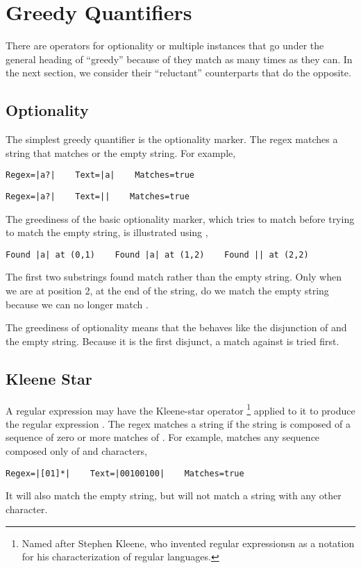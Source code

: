 \section{Greedy Quantifiers}

There are operators for optionality or multiple instances that go
under the general heading of ``greedy'' because of they match as
many times as they can.  In the next section, we consider their
``reluctant'' counterparts that do the opposite.

\subsection{Optionality}

The simplest greedy quantifier is the optionality marker.  The regex
 matches a string that matches  or the
empty string.  For example,
%
\begin{verbatim}
Regex=|a?|    Text=|a|    Matches=true
\end{verbatim}
%
\begin{verbatim}
Regex=|a?|    Text=||    Matches=true
\end{verbatim}

The greediness of the basic optionality marker, which tries to match
before trying to match the empty string, is illustrated using
,
%
\begin{verbatim}
Found |a| at (0,1)    Found |a| at (1,2)    Found || at (2,2)
\end{verbatim}
%
The first two substrings found match  rather than
the empty string.  Only when we are at position 2, at the
end of the string, do we match the empty string because we
can no longer match .

The greediness of optionality means that the 
behaves like the disjunction  of  and
the empty string.  Because it is the first disjunct, a match
against  is tried first.


\subsection{Kleene Star}

A regular expression  may have the Kleene-star operator%
%
\footnote{Named after Stephen Kleene, who invented regular expressionsn
as a notation for his characterization of regular languages.}
%
applied to it to produce the regular expression \code{*}.
The regex \code{*} matches a string if the string is
composed of a sequence of zero or more matches of .  For
example, \code{[01]*} matches any sequence composed only of 
and  characters,
%
\begin{verbatim}
Regex=|[01]*|    Text=|00100100|    Matches=true
\end{verbatim}
%
It will also match the empty string, but will not match a string with
any other character.

